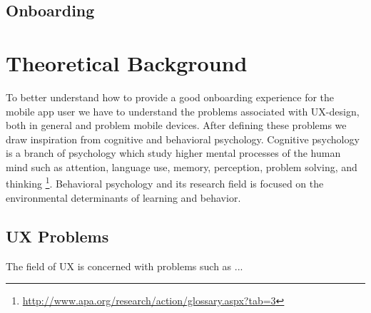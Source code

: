 \subsection{Onboarding}

\section{Theoretical Background}
To better understand how to provide a good onboarding experience for the mobile app user we have to understand the problems associated with UX-design, both in general and problem mobile devices. After defining these problems we draw inspiration from cognitive and behavioral psychology. Cognitive psychology is a branch of psychology which study higher mental processes of the human mind such as attention, language use, memory, perception, problem solving, and thinking \footnote{\url{http://www.apa.org/research/action/glossary.aspx?tab=3}}. Behavioral psychology and its research field is focused on the environmental determinants of learning and behavior.

\subsection{UX Problems}
The field of UX is concerned with problems such as ... 

